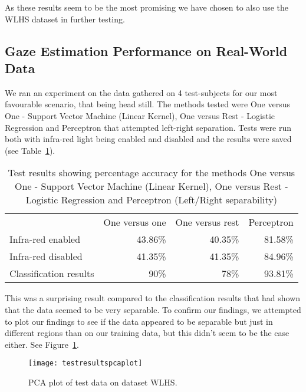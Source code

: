   As these results seem to be the most promising we have chosen to also use the WLHS dataset in further testing.

\subsection{Gaze Estimation Performance on Real-World Data}
\label{sub:GazeEstimationPerformanceonReal-WorldData}
We ran an experiment on the data gathered on 4 test-subjects for our most favourable scenario, that being head still. 
The methods tested were One versus One - Support Vector Machine (Linear Kernel), One versus Rest - Logistic Regression and Perceptron that attempted left-right separation.
Tests were run both with infra-red light being enabled and disabled and the results were saved (see Table~\ref{tab:test results}).

\begin{table}[h!]
\centering
\begin{tabular}{l|rrr}
\hline
\noalign{\smallskip}
 & One versus one & One versus rest & Perceptron\\
\noalign{\smallskip}
\hline
\noalign{\smallskip}
Infra-red enabled & 43.86\% & 40.35\% & 81.58\% \\
Infra-red disabled & 41.35\% & 41.35\% & 84.96\% \\
Classification results & 90\% & 78\% & 93.81\% \\
\hline
\end{tabular}
\caption{Test results showing percentage accuracy for the methods One versus One - Support Vector Machine (Linear Kernel), One versus Rest - Logistic Regression and Perceptron (Left/Right separability)}\label{tab:test results}
\end{table}

This was a surprising result compared to the classification results that had shown that the data seemed to be very separable.
To confirm our findings, we attempted to plot our findings to see if the data appeared to be separable but just in different regions than on our training data, but this didn't seem to be the case either.
See Figure~\ref{fig:testresultspcaplot}.

\begin{figure}[h!]
\centering
\texttt{[image: testresultspcaplot]}
\caption{PCA plot of test data on dataset WLHS.}
\label{fig:testresultspcaplot}
\end{figure}

